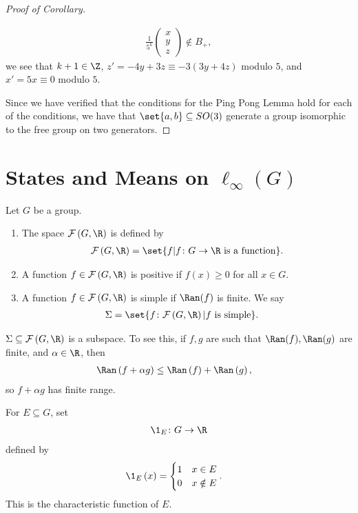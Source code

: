 \documentclass[10pt]{mypackage}
\begin{document}
\begin{proof}[Proof of Corollary]
\begin{enumerate}[(1)]
      \begin{align*}
        \frac{1}{5^{k}} \begin{pmatrix}x\\y\\z\end{pmatrix}\notin B_{+},
      \end{align*}
      we see that $k+1\in \Z$, $z' = -4y + 3z \equiv -3\left(3y + 4z\right)$ modulo $5$, and $x' = 5x \equiv 0$ modulo $5$.
  \end{enumerate}
  Since we have verified that the conditions for the Ping Pong Lemma hold for each of the conditions, we have that $\set{a,b}\subseteq SO(3)$ generate a group isomorphic to the free group on two generators.
\end{proof}
\section{States and Means on $\ell_{\infty}(G)$}%
\begin{definition}
  Let $G$ be a group.
  \begin{enumerate}[(1)]
    \item The space $\mathcal{F}\left(G,\R\right)$ is defined by
      \begin{align*}
        \mathcal{F}\left(G,\R\right) = \set{f | f\colon G\rightarrow \R\text{ is a function}}.
      \end{align*}
    \item A function $f\in \mathcal{F}\left(G,\R\right)$ is positive if $f(x) \geq 0$ for all $x\in G$.
    \item A function $f\in \mathcal{F}\left(G,\R\right)$ is simple if $\Ran(f)$ is finite. We say
      \begin{align*}
        \Sigma &= \set{f\colon \mathcal{F}\left(G,\R\right) | f\text{ is simple}}.
      \end{align*}
  \end{enumerate}
\end{definition}
\begin{fact}
  $\Sigma\subseteq \mathcal{F}\left(G,\R\right)$ is a subspace. To see this, if $f,g$ are such that $\Ran(f),\Ran(g)$ are finite, and $\alpha \in \R$, then
  \begin{align*}
    \Ran\left(f + \alpha g\right) &\leq \Ran\left(f\right) + \Ran\left(g\right),
  \end{align*}
  so $f + \alpha g$ has finite range.
\end{fact}
\begin{definition}
  For $E\subseteq G$, set
  \begin{align*}
    \1_{E}\colon G\rightarrow \R
  \end{align*}
  defined by
  \begin{align*}
    \1_{E}\left(x\right) &= \begin{cases}
      1 & x\in E\\
      0 & x\notin E
    \end{cases}.
  \end{align*}
  This is the characteristic function of $E$.
\end{definition}
\end{document}
